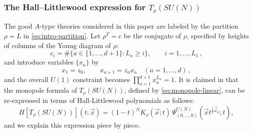 \documentclass[12pt,a4paper]{article}
\begin{document}
\subsubsection{The Hall--Littlewood expression for \texorpdfstring{$T_\rho(SU(N))$}{T-rho(SU(N))}}
\label{subsec:review-hl}

The good $A$-type theories considered in this paper are labeled by the partition
$\rho=L$ in \eqref{eq:intro-partition}.  
Let $\rho^T=c$ be the conjugate of $\rho$, specified by heights of columns of the Young diagram of $\rho$:
\begin{equation}
 c_i=\#\{a\in\{1,\ldots,d+1\}:L_a\geq i\},
 \qquad i=1,\ldots,L_1\,,
 \label{eq:column-height}
\end{equation}
and introduce variables $\{x_a\}$ by
\begin{equation}
 x_1=z_0,
 \qquad x_{a+1}=z_a{x_a}\quad (a=1,\ldots,d)\,,
 \label{eq:x-z-map}
\end{equation}
and the overall $U(1)$ constraint becomes
$\prod_{a=1}^{d+1}x_a^{L_a}=1$.  
It is claimed in \cite{CremonesiEtAl2014} that the monopole formula of $T_\rho(SU(N))$, defined by \eqref{eq:monopole-linear}, can be re-expressed in terms of Hall-Littlewood polynomials as follows:
\begin{equation}
 H[T_\rho(SU(N))](t;\vec{x})
 =(1-t)^N K_\rho(\vec{x};t)\,
   \Psi^{U(N)}_{(0,\ldots,0)}(\vec{x}t^{\frac{1}{2}\vec{\omega}_\rho};t),
 \label{eq:chmz-hl}
\end{equation}
and we explain this expression piece by piece.
\end{document}
